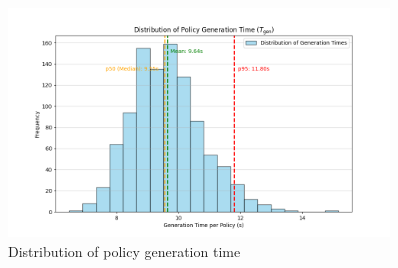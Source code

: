 \begin{figure}[htbp]
	\centering
	\includegraphics[width=0.9\textwidth]{Figures/speed_distribution.png}
	\caption{Distribution of policy generation time}\label{fig:speed-distribution}
\end{figure}

